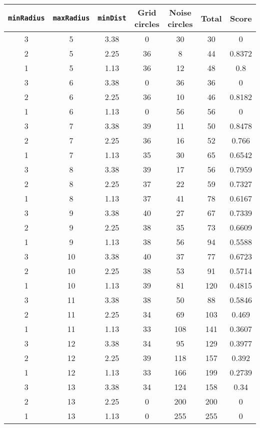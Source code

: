\documentclass[letterpaper, 12pt]{article}
\begin{document}
\begin{longtable}{|c|c|c|c|c|c|c|}
\hline
\textbf{\texttt{minRadius}} & \textbf{\texttt{maxRadius}} & \textbf{\texttt{minDist}} & \textbf{Grid circles} & \textbf{Noise circles} & \textbf{Total} & \textbf{Score} \\
\hline
3 & 5 & 3.38 & 0 & 30 & 30 & 0 \\
\hline
2 & 5 & 2.25 & 36 & 8 & 44 & 0.8372 \\
\hline
1 & 5 & 1.13 & 36 & 12 & 48 & 0.8 \\
\hline
3 & 6 & 3.38 & 0 & 36 & 36 & 0 \\
\hline
2 & 6 & 2.25 & 36 & 10 & 46 & 0.8182 \\
\hline
1 & 6 & 1.13 & 0 & 56 & 56 & 0 \\
\hline
3 & 7 & 3.38 & 39 & 11 & 50 & 0.8478 \\
\hline
2 & 7 & 2.25 & 36 & 16 & 52 & 0.766 \\
\hline
1 & 7 & 1.13 & 35 & 30 & 65 & 0.6542 \\
\hline
3 & 8 & 3.38 & 39 & 17 & 56 & 0.7959 \\
\hline
2 & 8 & 2.25 & 37 & 22 & 59 & 0.7327 \\
\hline
1 & 8 & 1.13 & 37 & 41 & 78 & 0.6167 \\
\hline
3 & 9 & 3.38 & 40 & 27 & 67 & 0.7339 \\
\hline
2 & 9 & 2.25 & 38 & 35 & 73 & 0.6609 \\
\hline
1 & 9 & 1.13 & 38 & 56 & 94 & 0.5588 \\
\hline
3 & 10 & 3.38 & 40 & 37 & 77 & 0.6723 \\
\hline
2 & 10 & 2.25 & 38 & 53 & 91 & 0.5714 \\
\hline
1 & 10 & 1.13 & 39 & 81 & 120 & 0.4815 \\
\hline
3 & 11 & 3.38 & 38 & 50 & 88 & 0.5846 \\
\hline
2 & 11 & 2.25 & 34 & 69 & 103 & 0.469 \\
\hline
1 & 11 & 1.13 & 33 & 108 & 141 & 0.3607 \\
\hline
3 & 12 & 3.38 & 34 & 95 & 129 & 0.3977 \\
\hline
2 & 12 & 2.25 & 39 & 118 & 157 & 0.392 \\
\hline
1 & 12 & 1.13 & 33 & 166 & 199 & 0.2739 \\
\hline
3 & 13 & 3.38 & 34 & 124 & 158 & 0.34 \\
\hline
2 & 13 & 2.25 & 0 & 200 & 200 & 0 \\
\hline
1 & 13 & 1.13 & 0 & 255 & 255 & 0 \\

\end{longtable}
\end{document}
